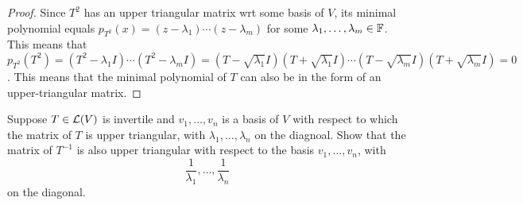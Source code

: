 \documentclass{extarticle}
\begin{document}
\begin{proof}

Since \(T^2\) has an upper triangular matrix wrt some basis of \(V\), its minimal polynomial 
equals \(p_{T^2}(x) = (z - \lambda_1)\cdots(z - \lambda_m)\) for some \(\lambda_1, \ldots, \lambda_m \in \mathbb{F}\). 
This means that \(p_{T^2}(T^2) = (T^2 - \lambda_1 I) \cdots (T^2 - \lambda_m I) = (T - \sqrt{\lambda_1}I) 
(T + \sqrt{\lambda_1}I)\cdots(T - \sqrt{\lambda_m}I)(T + \sqrt{\lambda_m}I) = 0\). This means that the minimal polynomial 
of \(T\) can also be in the form of an upper-triangular matrix.  





\end{proof}


\begin{problem}{3}
    Suppose \(T \in \mathcal{L}(V)\) is invertile and \(v_1, \ldots, v_n\) is a basis of \(V\) with respect 
    to which the matrix of \(T\) is upper triangular, with \(\lambda_1, \ldots, \lambda_n\) on the 
    diagnoal. Show that the matrix of \(T^{-1}\) is also upper triangular with respect to the basis 
    \(v_1, \ldots, v_n\), with 
    \[\frac{1}{\lambda_1}, \ldots, \frac{1}{\lambda_n}\]
    on the diagonal. 
\end{problem}
\end{document}

